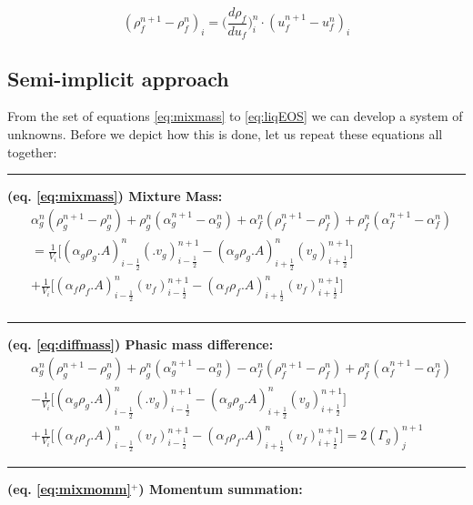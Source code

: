 \documentclass[11pt,letterpaper,titlepage]{article}
\newcommand{\half}{\frac{1}{2}}
\begin{document}
\begin{equation} \label{eq:liqEOS}
(\rho_{f}^{n+1} - \rho_{f}^{n})_i= \biggr( \frac{d\rho_f}{du_f} \biggr)_i^n \cdot (u_{f}^{n+1} - u_{f}^{n})_i
\end{equation}





\newpage
\begin{landscape}
\subsection{Semi-implicit approach}
From the set of equations \ref{eq:mixmass} to \ref{eq:liqEOS} we can develop a system of unknowns. Before we depict how this is done, let us repeat these equations all together:\newline
\noindent\rule{9in}{0.4pt}
\textbf{(eq. \ref{eq:mixmass}) Mixture Mass: }
\begin{equation*}
\begin{aligned}
&\alpha_g^n (\rho_g^{n+1}-\rho_g^n)+\rho_g^n(\alpha_g^{n+1}-\alpha_g^n)
+\alpha_f^n (\rho_f^{n+1}-\rho_f^n)+\rho_f^n(\alpha_f^{n+1}-\alpha_f^n)\\
&= \frac{1}{V_i}\biggr[(\alpha_g\rho_g.A)_{i-\half}^{n} (.v_g)_{i-\half}^{n+1}
-(\alpha_g\rho_g.A)_{i+\half}^{n} (v_g)_{i+\half}^{n+1} \biggr]\\
&+ \frac{1}{V_i}\biggr[(\alpha_f\rho_f.A)_{i-\half}^{n} (v_f)_{i-\half}^{n+1}
-(\alpha_f\rho_f.A)_{i+\half}^{n} (v_f)_{i+\half}^{n+1} \biggr]\\
\end{aligned}
\end{equation*}
\noindent\rule{9in}{0.4pt}
\textbf{(eq. \ref{eq:diffmass}) Phasic mass difference:}
\begin{equation*}
\begin{aligned}
&\alpha_g^n (\rho_g^{n+1}-\rho_g^n)+\rho_g^n(\alpha_g^{n+1}-\alpha_g^n)-\alpha_f^n (\rho_f^{n+1}-\rho_f^n)+\rho_f^n(\alpha_f^{n+1}-\alpha_f^n)\\
&-\frac{1}{V_i}\biggr[(\alpha_g\rho_g.A)_{i-\half}^{n} (.v_g)_{i-\half}^{n+1}
-(\alpha_g\rho_g.A)_{i+\half}^{n} (v_g)_{i+\half}^{n+1} \biggr]\\
&+ \frac{1}{V_i}\biggr[(\alpha_f\rho_f.A)_{i-\half}^{n} (v_f)_{i-\half}^{n+1}
-(\alpha_f\rho_f.A)_{i+\half}^{n} (v_f)_{i+\half}^{n+1} \biggr]
=2(\Gamma_g)_j^{n+1}
\end{aligned}
\end{equation*}
\noindent\rule{9in}{0.4pt}
\textbf{(eq. \ref{eq:mixmomm}$^+$) Momentum summation:}

\end{landscape}
\end{document}
